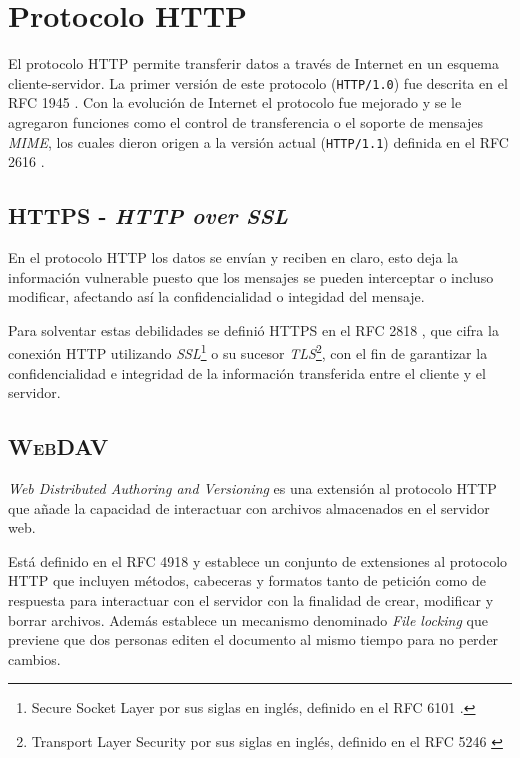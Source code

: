 
\section {Protocolo \textsc{HTTP}}

El protocolo \textsc{HTTP} permite transferir datos a trav\'{e}s de Internet en un esquema cliente-servidor. La primer versi\'{o}n de este protocolo (\texttt{HTTP/1.0}) fue descrita en el \textsc{RFC} 1945 \cite{_rfc_????-1}. Con la evoluci\'{o}n de Internet el protocolo fue mejorado y se le agregaron funciones como el control de transferencia o el soporte de mensajes \textit{MIME}, los cuales dieron origen a la versi\'{o}n actual (\texttt{HTTP/1.1}) definida en el RFC 2616 \cite{_rfc_????}.

  \subsection {\textsc{HTTPS} - \textit{HTTP over SSL}}

En el protocolo \textsc{HTTP} los datos se env\'{i}an y reciben en claro, esto deja la informaci\'{o}n vulnerable puesto que los mensajes se pueden interceptar o incluso modificar, afectando as\'{i} la confidencialidad o integidad del mensaje.

Para solventar estas debilidades se defini\'{o} \textsc{HTTPS} en el \textsc{RFC} 2818 \cite{_rfc_????-6}, que cifra la conexi\'{o}n \textsc{HTTP} utilizando \emph{SSL}\footnote{Secure Socket Layer por sus siglas en ingl\'{e}s, definido en el \textsc{RFC} 6101 \cite{_rfc_????-4}.} o su sucesor \emph{TLS}\footnote{Transport Layer Security por sus siglas en ingl\'{e}s, definido en el \textsc{RFC} 5246 \cite{_rfc_????-3}}, con el fin de garantizar la confidencialidad e integridad de la informaci\'{o}n transferida entre el cliente y el servidor.

  \subsection {\textsc{WebDAV}}

\textit{Web Distributed Authoring and Versioning} es una extensi\'{o}n al protocolo \textsc{HTTP} que a\~{n}ade la capacidad de interactuar con archivos almacenados en el servidor web.

Est\'{a} definido en el \textsc{RFC} 4918 \cite{_rfc_????-2} y establece un conjunto de extensiones al protocolo \textsc{HTTP} que incluyen m\'{e}todos, cabeceras y formatos tanto de petici\'{o}n como de respuesta para interactuar con el servidor con la finalidad de crear, modificar y borrar archivos. Adem\'{a}s establece un mecanismo denominado \textit{File locking} que previene que dos personas editen el documento al mismo tiempo para no perder cambios.

